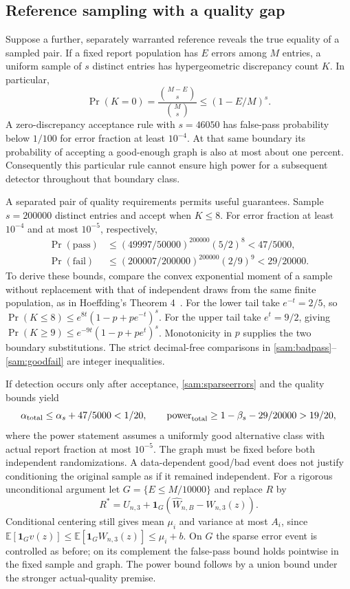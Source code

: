 \subsection{Reference sampling with a quality gap}
\label{sam:quality}
Suppose a further, separately warranted reference reveals the true equality of a sampled pair. If a fixed report population has $E$ errors among $M$ entries, a uniform sample of $s$ distinct entries has hypergeometric discrepancy count $K$. In particular,
\[
 \Pr(K=0)=\frac{\binom{M-E}s}{\binom Ms}\le(1-E/M)^s.
\]
A zero-discrepancy acceptance rule with $s=46050$ has false-pass probability below $1/100$ for error fraction at least $10^{-4}$. At that same boundary its probability of accepting a good-enough graph is also at most about one percent. Consequently this particular rule cannot ensure high power for a subsequent detector throughout that boundary class.

A separated pair of quality requirements permits useful guarantees. Sample $s=200000$ distinct entries and accept when $K\le8$. For error fraction at least $10^{-4}$ and at most $10^{-5}$, respectively,
\begin{align}
 \Pr(\mathrm{pass})&\le(49997/50000)^{200000}(5/2)^8<47/5000,
 \label{sam:badpass}\\
 \Pr(\mathrm{fail})&\le(200007/200000)^{200000}(2/9)^9<29/20000.
 \label{sam:goodfail}
\end{align}
To derive these bounds, compare the convex exponential moment of a sample without replacement with that of independent draws from the same finite population, as in Hoeffding's Theorem 4~\cite{hoeffding}. For the lower tail take $e^{-t}=2/5$, so
$\Pr(K\le8)\le e^{8t}(1-p+pe^{-t})^s$.
For the upper tail take $e^t=9/2$, giving
$\Pr(K\ge9)\le e^{-9t}(1-p+pe^t)^s$.
Monotonicity in $p$ supplies the two boundary substitutions. The strict decimal-free comparisons in \eqref{sam:badpass}--\eqref{sam:goodfail} are integer inequalities.

If detection occurs only after acceptance, \eqref{sam:sparseerrors} and the quality bounds yield
\[
 \alpha_{\rm total}\le\alpha_s+47/5000<1/20,
 \qquad
 \mathrm{power}_{\rm total}\ge1-\beta_s-29/20000>19/20,
\]
where the power statement assumes a uniformly good alternative class with actual report fraction at most $10^{-5}$. The graph must be fixed before both independent randomizations. A data-dependent good/bad event does not justify conditioning the original sample as if it remained independent. For a rigorous unconditional argument let $G=\{E\le M/10000\}$ and replace $R$ by
\[
 R^*=U_{n,3}+\mathbf1_G(\widehat W_{n,B}-W_{n,3}(z)).
\]
Conditional centering still gives mean $\mu_i$ and variance at most $A_i$, since
$\mathbb E[\mathbf1_Gv(z)]\le\mathbb E[\mathbf1_GW_{n,3}(z)]\le\mu_i+b$.
On $G$ the sparse error event is controlled as before; on its complement the false-pass bound holds pointwise in the fixed sample and graph. The power bound follows by a union bound under the stronger actual-quality premise.

